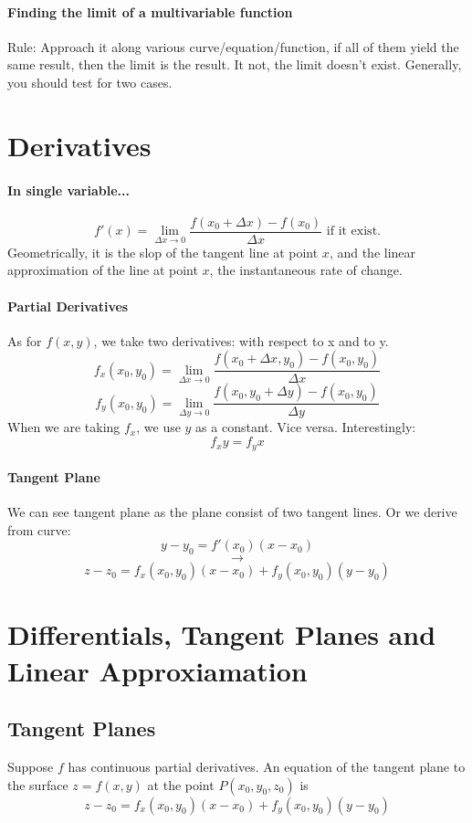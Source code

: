 \documentclass[11pt, oneside]{article}   	%
\begin{document}
\paragraph{Finding the limit of a multivariable function} 
Rule: Approach it along various curve/equation/function, if all of them yield the same result, then the limit is the result. It not, the limit doesn't exist. Generally, you should test for two cases. 




\section{Derivatives}
\paragraph{In single variable...}
$$f'(x) = \lim_{\Delta x \to 0} \frac{f(x_0 + \Delta x) - f(x_0)}{\Delta x}  \text{ if it exist.} $$
Geometrically, it is the slop of the tangent line at point $x$, and the linear approximation of the line at point $x$, the instantaneous rate of change.
\paragraph{Partial Derivatives}
As for $f(x,y)$, we take two derivatives: with respect to x and to y. 
$$f_x(x_0,y_0) = \lim_{\Delta x \to 0} \frac{f(x_0 + \Delta x, y_0) - f(x_0, y_0)}{\Delta x}  $$
$$f_y(x_0,y_0) = \lim_{\Delta y \to 0} \frac{f(x_0, y_0 + \Delta y) - f(x_0, y_0)}{\Delta y}  $$
When we are taking $f_x$, we use $y$ as a constant. Vice versa. Interestingly: 
$$f_xy = f_yx$$

\paragraph{Tangent Plane}
We can see tangent plane as the plane consist of two tangent lines. 
Or we derive from curve:
$$y - y_0 = f'(x_0)(x-x_0)$$
$$\to$$
 $$z - z_0 = f_x(x_0, y_0)(x-x_0)+f_y(x_0,y_0)(y-y_0)$$


\section{Differentials, Tangent Planes and Linear Approxiamation}
\subsection{Tangent Planes}
Suppose $f$ has continuous partial derivatives. An equation of the tangent plane to the surface $z = f(x,y)$ at the point $P(x_0,y_0,z_0)$ is $$z - z_0 = f_x(x_0, y_0)(x-x_0)+f_y(x_0,y_0)(y-y_0)$$
\end{document}
